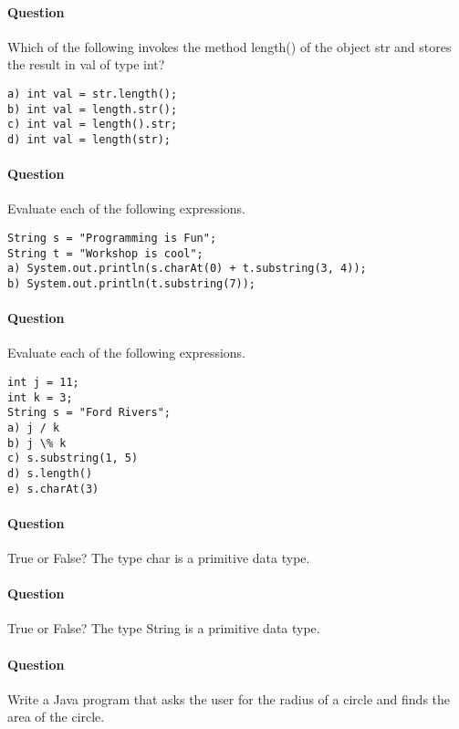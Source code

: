 \documentclass{article}
\begin{document}
\addtocounter{question_num}{1}
\paragraph{Question }
Which of the following invokes the method length() of the object str and stores the result in val of type int?
\begin{lstlisting}
a) int val = str.length();
b) int val = length.str();
c) int val = length().str;
d) int val = length(str);
\end{lstlisting}

\addtocounter{question_num}{1}
\paragraph{Question }
Evaluate each of the following expressions.
\begin{lstlisting}
String s = "Programming is Fun";
String t = "Workshop is cool";
a) System.out.println(s.charAt(0) + t.substring(3, 4));
b) System.out.println(t.substring(7));
\end{lstlisting}

\addtocounter{question_num}{1}
\paragraph{Question }
Evaluate each of the following expressions.
\begin{lstlisting}
int j = 11;
int k = 3;
String s = "Ford Rivers";
a) j / k
b) j \% k
c) s.substring(1, 5)
d) s.length()
e) s.charAt(3)
\end{lstlisting}

\addtocounter{question_num}{1}
\paragraph{Question }
True or False? The type char is a primitive data type.

\addtocounter{question_num}{1}
\paragraph{Question }
True or False? The type String is a primitive data type.

\addtocounter{question_num}{1}
\paragraph{Question }
Write a Java program that asks the user for the radius of a circle and finds the area of the circle.
\end{document}
